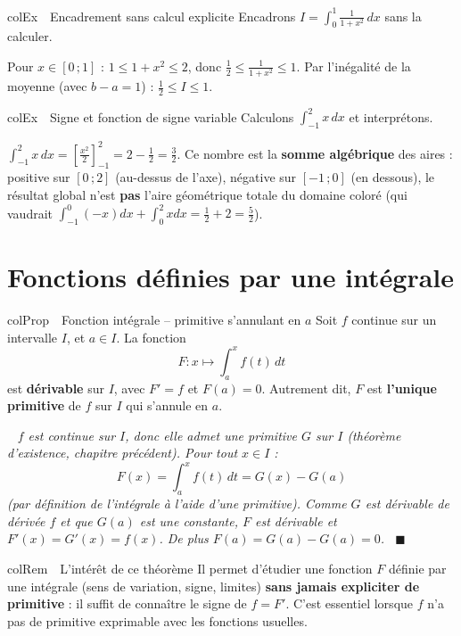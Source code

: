 \documentclass[11pt,a4paper]{article}
\newenvironment{propriete}[1][Propriété]
  {\begin{fiche}{colProp}{\ding{72}~~#1}}{\end{fiche}}
\newenvironment{exemple}[1][Exemple]
  {\begin{fiche}{colEx}{\ding{217}~~#1}}{\end{fiche}}
\newenvironment{remarque}[1][Remarque]
  {\begin{fiche}{colRem}{\ding{43}~~#1}}{\end{fiche}}
\newenvironment{demo}
  {\par\smallskip\noindent{\sffamily\bfseries\color{qtealdark}Démonstration.}\ \itshape}
  {\ \normalfont\hfill$\blacksquare$\par\medskip}
\begin{document}
\begin{exemple}[Encadrement sans calcul explicite]
Encadrons $I=\displaystyle\int_0^1\frac{1}{1+x^2}\,dx$ sans la calculer.

\smallskip
Pour $x\in[0\,;1]$ : $1\leq1+x^2\leq2$, donc $\frac12\leq\frac{1}{1+x^2}\leq1$. Par l'inégalité de la moyenne (avec $b-a=1$) : $\frac12\leq I\leq1$.
\end{exemple}

\begin{exemple}[Signe et fonction de signe variable]
Calculons $\displaystyle\int_{-1}^{2}x\,dx$ et interprétons.

\smallskip
$\displaystyle\int_{-1}^{2}x\,dx = \left[\frac{x^2}{2}\right]_{-1}^{2} = 2-\frac12 = \frac32$. Ce nombre est la \textbf{somme algébrique} des aires : positive sur $[0\,;2]$ (au-dessus de l'axe), négative sur $[-1\,;0]$ (en dessous), le résultat global n'est \textbf{pas} l'aire géométrique totale du domaine coloré (qui vaudrait $\int_{-1}^0(-x)dx+\int_0^2xdx = \frac12+2=\frac52$).
\end{exemple}

\section{Fonctions définies par une intégrale}

\begin{propriete}[Fonction intégrale -- primitive s'annulant en $a$]
Soit $f$ continue sur un intervalle $I$, et $a\in I$. La fonction
\[
  F : x \longmapsto \int_a^x f(t)\,dt
\]
est \textbf{dérivable} sur $I$, avec $F'=f$ et $F(a)=0$. Autrement dit, $F$ est \textbf{l'unique primitive} de $f$ sur $I$ qui s'annule en $a$.
\end{propriete}

\begin{demo}
$f$ est continue sur $I$, donc elle admet une primitive $G$ sur $I$ (théorème d'existence, chapitre précédent). Pour tout $x\in I$ :
\[
  F(x) = \int_a^x f(t)\,dt = G(x)-G(a)
\]
(par définition de l'intégrale à l'aide d'une primitive). Comme $G$ est dérivable de dérivée $f$ et que $G(a)$ est une constante, $F$ est dérivable et $F'(x)=G'(x)=f(x)$. De plus $F(a)=G(a)-G(a)=0$.
\end{demo}

\begin{remarque}[L'intérêt de ce théorème]
Il permet d'étudier une fonction $F$ définie par une intégrale (sens de variation, signe, limites) \textbf{sans jamais expliciter de primitive} : il suffit de connaître le signe de $f=F'$. C'est essentiel lorsque $f$ n'a pas de primitive exprimable avec les fonctions usuelles.
\end{remarque}
\end{document}
